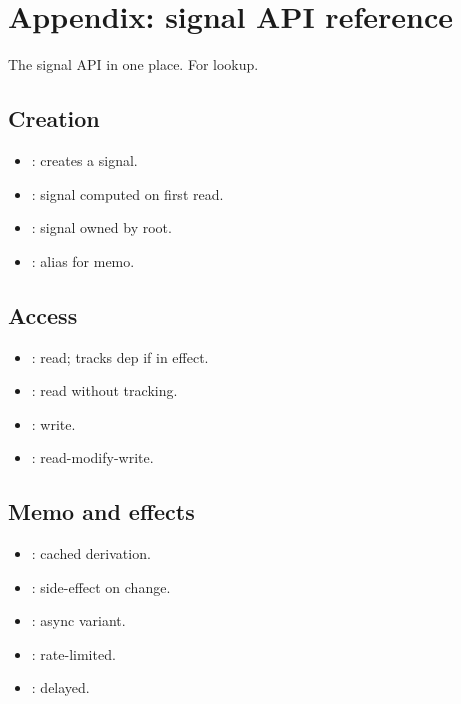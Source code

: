 \chapter{Appendix: signal API reference}
\label{ch:signalref}

\begin{aside}
The signal API in one place. For lookup.
\end{aside}

\section{Creation}

\begin{itemize}[leftmargin=*]
  \item {}: creates a signal.
  \item {}: signal computed on first
    read.
  \item {}: signal owned by root.
  \item {}: alias for memo.
\end{itemize}

\section{Access}

\begin{itemize}[leftmargin=*]
  \item {}: read; tracks dep if in effect.
  \item {}: read without tracking.
  \item {}: write.
  \item {}: read-modify-write.
\end{itemize}

\section{Memo and effects}

\begin{itemize}[leftmargin=*]
  \item {}: cached derivation.
  \item {}: side-effect on change.
  \item {}: async variant.
  \item {}: rate-limited.
  \item {}: delayed.
\end{itemize}

